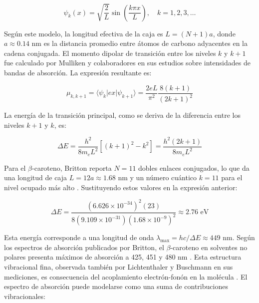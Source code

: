 \documentclass[12pt, a4paper]{article}
\begin{document}
	\begin{equation}
		\psi_k(x) = \sqrt{\frac{2}{L}} \sin\left(\frac{k\pi x}{L}\right), \quad k = 1, 2, 3, \ldots
		\label{eq:funcion_onda_carotenoide}
	\end{equation}
	
	Según este modelo, la longitud efectiva de la caja es $L = (N+1)a$, donde $a \approx 0.14$ nm es la distancia promedio entre átomos de carbono adyacentes en la cadena conjugada. El momento dipolar de transición entre los niveles $k$ y $k+1$ fue calculado por Mulliken y colaboradores en sus estudios sobre intensidades de bandas de absorción. La expresión resultante es:
	
	\begin{equation}
		\mu_{k,k+1} = \langle \psi_k | e x | \psi_{k+1} \rangle = \frac{2eL}{\pi^2} \frac{8(k+1)}{(2k+1)^2}
		\label{eq:momento_dipolar_carotenoide}
	\end{equation}
	
	La energía de la transición principal, como se deriva de la diferencia entre los niveles $k+1$ y $k$, es:
	
	\begin{equation}
		\Delta E = \frac{h^2}{8 m_e L^2} \left[ (k+1)^2 - k^2 \right] = \frac{h^2(2k+1)}{8 m_e L^2}
		\label{eq:energia_transicion_carotenoide}
	\end{equation}
	
	Para el $\beta$-caroteno, Britton reporta $N=11$ dobles enlaces conjugados, lo que da una longitud de caja $L = 12a \approx 1.68$ nm y un número cuántico $k=11$ para el nivel ocupado más alto \parencite{Britton1995}. Sustituyendo estos valores en la expresión anterior:
	
	\begin{equation}
		\Delta E = \frac{(6.626 \times 10^{-34})^2 (23)}{8 (9.109 \times 10^{-31}) (1.68 \times 10^{-9})^2} \approx 2.76 \text{ eV}
		\label{eq:energia_carotenoide_calculada}
	\end{equation}
	
	Esta energía corresponde a una longitud de onda $\lambda_{\max} = hc/\Delta E \approx 449$ nm. Según los espectros de absorción publicados por Britton, el $\beta$-caroteno en solventes no polares presenta máximos de absorción a 425, 451 y 480 nm \parencite{Britton1995}. Esta estructura vibracional fina, observada también por Lichtenthaler y Buschmann en sus mediciones, es consecuencia del acoplamiento electrón-fonón en la molécula \parencite{lichtenthaler2001}. El espectro de absorción puede modelarse como una suma de contribuciones vibracionales:
	
\end{document}
